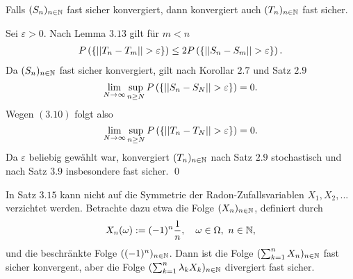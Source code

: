 \begin{theorem}
    Falls $(S_n)_{n \in \mathbb{N}}$ fast sicher konvergiert, dann konvergiert auch $(T_n)_{n \in \mathbb{N}}$ fast sicher. 
\end{theorem}
\begin{proof*}
    Sei $\varepsilon > 0$. Nach Lemma $3.13$ gilt für $m < n$
    \begin{align}
        P\left(\left\{ \lvert\lvert T_n - T_m \rvert\rvert > \varepsilon \right\}\right) \leq 2P\left(\left\{ \lvert\lvert S_n - S_m \rvert\rvert > \varepsilon \right\}\right). 
    \end{align}
    Da $(S_n)_{n \in \mathbb{N}}$ fast sicher konvergiert, gilt nach Korollar $2.7$ und Satz $2.9$
    $$
        \lim_{N \to \infty} \sup_{n \geq N}P\left(\left\{ \lvert\lvert S_n-S_N \rvert\rvert > \varepsilon \right\}\right) = 0. 
    $$
    Wegen $(3.10)$ folgt also 
    $$
        \lim_{N \to \infty} \sup_{n \geq N}P\left(\left\{ \lvert\lvert T_n-T_N \rvert\rvert > \varepsilon \right\}\right) = 0.
    $$
    Da $\varepsilon$ beliebig gewählt war, konvergiert $(T_n)_{n \in \mathbb{N}}$ nach Satz $2.9$ stochastisch und nach Satz $3.9$ insbesondere fast sicher. \qed
\end{proof*}

\begin{remark}
    In Satz $3.15$ kann nicht auf die Symmetrie der Radon-Zufallsvariablen $X_1,X_2,...$ verzichtet werden. 
    Betrachte dazu etwa die Folge $(X_n)_{n \in \mathbb{N}}$, definiert durch
    $$
        X_n(\omega) := (-1)^n \frac{1}{n},  \quad \omega \in \Omega, \ n \in \mathbb{N}, 
    $$ 
    und die beschränkte Folge $((-1)^n)_{n \in \mathbb{N}}$. Dann ist die Folge $(\sum_{k=1}^n X_n)_{n \in \mathbb{N}}$ fast sicher konvergent, aber die Folge $(\sum_{k=1}^n\lambda_k X_k)_{n \in \mathbb{N}}$ divergiert fast sicher. 
    \qexampled
\end{remark}